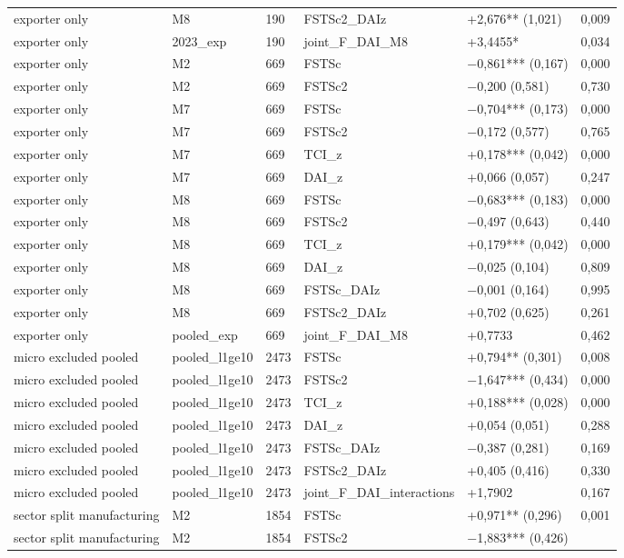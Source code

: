 \documentclass[12pt,a4paper]{article}
\begin{document}
\begin{longtable}[]{@{}llllll@{}}
exporter only & M8 & 190 & FSTSc2\_DAIz & +2,676** (1,021) & 0,009 \\
exporter only & 2023\_exp & 190 & joint\_F\_DAI\_M8 & +3,4455* &
0,034 \\
exporter only & M2 & 669 & FSTSc & −0,861*** (0,167) & 0,000 \\
exporter only & M2 & 669 & FSTSc2 & −0,200 (0,581) & 0,730 \\
exporter only & M7 & 669 & FSTSc & −0,704*** (0,173) & 0,000 \\
exporter only & M7 & 669 & FSTSc2 & −0,172 (0,577) & 0,765 \\
exporter only & M7 & 669 & TCI\_z & +0,178*** (0,042) & 0,000 \\
exporter only & M7 & 669 & DAI\_z & +0,066 (0,057) & 0,247 \\
exporter only & M8 & 669 & FSTSc & −0,683*** (0,183) & 0,000 \\
exporter only & M8 & 669 & FSTSc2 & −0,497 (0,643) & 0,440 \\
exporter only & M8 & 669 & TCI\_z & +0,179*** (0,042) & 0,000 \\
exporter only & M8 & 669 & DAI\_z & −0,025 (0,104) & 0,809 \\
exporter only & M8 & 669 & FSTSc\_DAIz & −0,001 (0,164) & 0,995 \\
exporter only & M8 & 669 & FSTSc2\_DAIz & +0,702 (0,625) & 0,261 \\
exporter only & pooled\_exp & 669 & joint\_F\_DAI\_M8 & +0,7733 &
0,462 \\
micro excluded pooled & pooled\_l1ge10 & 2473 & FSTSc & +0,794** (0,301)
& 0,008 \\
micro excluded pooled & pooled\_l1ge10 & 2473 & FSTSc2 & −1,647***
(0,434) & 0,000 \\
micro excluded pooled & pooled\_l1ge10 & 2473 & TCI\_z & +0,188***
(0,028) & 0,000 \\
micro excluded pooled & pooled\_l1ge10 & 2473 & DAI\_z & +0,054 (0,051)
& 0,288 \\
micro excluded pooled & pooled\_l1ge10 & 2473 & FSTSc\_DAIz & −0,387
(0,281) & 0,169 \\
micro excluded pooled & pooled\_l1ge10 & 2473 & FSTSc2\_DAIz & +0,405
(0,416) & 0,330 \\
micro excluded pooled & pooled\_l1ge10 & 2473 &
joint\_F\_DAI\_interactions & +1,7902 & 0,167 \\
sector split manufacturing & M2 & 1854 & FSTSc & +0,971** (0,296) &
0,001 \\
sector split manufacturing & M2 & 1854 & FSTSc2 & −1,883*** (0,426) &

\end{longtable}
\end{document}
